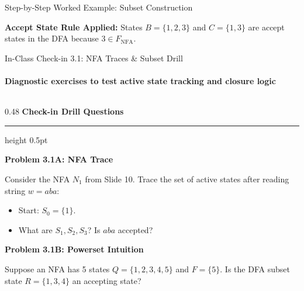 \documentclass[aspectratio=169, 10pt]{beamer}
\newcommand{\colheader}[1]{%
  {\noindent\footnotesize\bfseries\color{gimpanavy}#1}%
  \vspace{0.02cm}%
  {\color{gimpanavy!30}\hrule height 0.5pt}%
  \vspace{0.05cm}%
}
\newcommand{\ambertitle}[1]{{\noindent\footnotesize\bfseries\color{accentAmber}#1}\par\vspace{0.03cm}}
\begin{document}
\begin{frame}{Step-by-Step Worked Example: Subset Construction}
  \vspace{0.02cm}
  \begin{tcolorbox}[spotlightcard]
    {\scriptsize\textbf{Accept State Rule Applied:} States $B = \{1, 2, 3\}$ and $C = \{1, 3\}$ are accept states in the DFA because $3 \in F_{\text{NFA}}$.}
  \end{tcolorbox}
\end{frame}

\begin{frame}{In-Class Check-in 3.1: NFA Traces \& Subset Drill}
  \framesubtitle{Diagnostic exercises to test active state tracking and closure logic}
  
  \begin{columns}[T]
    \begin{column}{0.48\textwidth}
      \colheader{Check-in Drill Questions}
      \begin{tcolorbox}[quizcard]
        \ambertitle{Problem 3.1A: NFA Trace}
        {\scriptsize
        Consider the NFA $N_1$ from Slide 10. Trace the set of active states after reading string $w = aba$:
        \begin{itemize}\setlength{\itemsep}{1pt}\scriptsize
          \item Start: $S_0 = \{1\}$.
          \item What are $S_1, S_2, S_3$? Is $aba$ accepted?
        \end{itemize}
        }
        \vspace{0.04cm}
        
        \ambertitle{Problem 3.1B: Powerset Intuition}
        {\scriptsize
        Suppose an NFA has 5 states $Q = \{1, 2, 3, 4, 5\}$ and $F = \{5\}$. Is the DFA subset state $R = \{1, 3, 4\}$ an accepting state?
        }
      \end{tcolorbox}
    \end{column}
    

\end{columns}
\end{frame}
\end{document}
